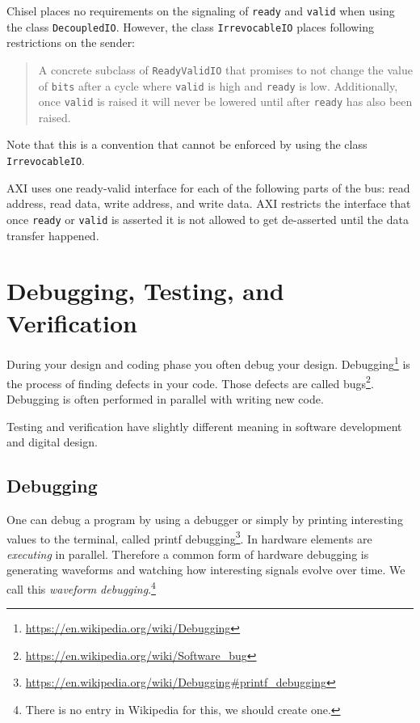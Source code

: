 \documentclass[%
    10pt,
    headinclude, footexclude,
    openright, %
    notitlepage,
    cleardoubleempty,
    headsepline,
    pointlessnumbers,
    bibtotoc, idxtotoc,
    ]{scrbook}
\newcommand{\code}[1]{{\small{\texttt{#1}}}}
\newcommand{\todo}[1]{{\emph{TODO: #1}}}
\newcommand{\myref}[2]{\href{#1}{#2}}
\renewcommand{\myref}[2]{{#2}{\footnote{\url{#1}}}}
\renewcommand{\todo}[1]{}
\begin{document}
Chisel places no requirements on the signaling of \code{ready} and \code{valid}
when using the class \code{DecoupledIO}.
However, the class \code{IrrevocableIO} places following restrictions
on the sender:

\begin{quote}
A concrete subclass of \code{ReadyValidIO} that promises to not change
the value of \code{bits} after a cycle where \code{valid} is high and \code{ready} is low.
Additionally, once \code{valid} is raised it will never be lowered until after
\code{ready} has also been raised.
\end{quote}

\noindent Note that this is a convention that cannot be enforced by using the class
\code{IrrevocableIO}.

AXI uses one ready-valid interface for each of the following parts of the bus:
read address, read data, write address, and write data. AXI restricts the interface
that once \code{ready} or \code{valid} is asserted it is not allowed to get de-asserted
until the data transfer happened.

\todo{Read and cite AXI, and check if the above is true}

\todo{Reconsider writing the testing chapter}

\chapter{Debugging, Testing, and Verification}
\label{chap:testing}


During your design and coding phase you often debug your design.
\myref{https://en.wikipedia.org/wiki/Debugging}{Debugging} is the process of
finding defects in your code. Those defects are called
\myref{https://en.wikipedia.org/wiki/Software_bug}{bugs}.
Debugging is often performed in parallel with writing new code.

Testing and verification have slightly different meaning in software development
and digital design.

\section{Debugging}

One can debug a program by using a debugger or simply by printing interesting
values to the terminal, called \myref{https://en.wikipedia.org/wiki/Debugging\#printf\_debugging}{printf debugging}.
In hardware elements are \emph{executing} in parallel. Therefore a common form of hardware
debugging is generating waveforms and watching how interesting signals evolve over time.
We call this \emph{waveform debugging}.\footnote{There is no entry in Wikipedia for this,
we should create one.}
\end{document}
